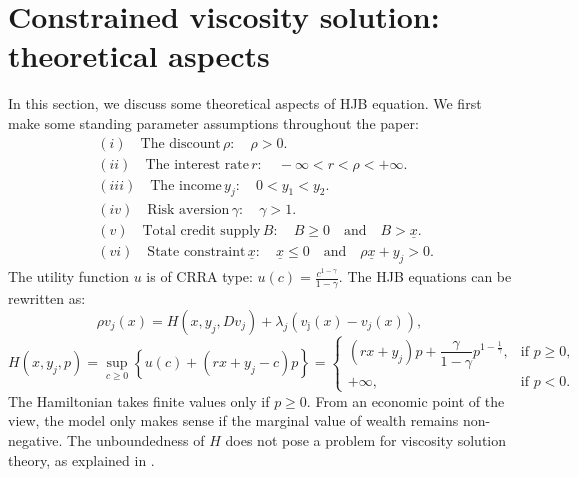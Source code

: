 \documentclass[11pt]{article}
\numberwithin{equation}{section}
\theoremstyle{Claim}
\newcommand{\ux}{{\underline x}}
\newcommand{\beq}{\begin{equation}}
\newcommand{\eeq}{\end{equation}}
\theoremstyle{plain}
\begin{document}
\section{Constrained viscosity solution: theoretical aspects}
In this section, we discuss some theoretical aspects of HJB equation. We first make some standing parameter assumptions throughout the paper:
\beq\label{standing assump}
\begin{aligned}
&(i)\quad\text{The discount}\,\rho: \quad \rho>0.\\
&(ii)\quad\text{The interest rate}\,r:\quad -\infty<r<\rho<+\infty.\\
&(iii)\quad\text{The income}\,y_j:\quad 0<y_1<y_2.\\
&(iv)\quad\text{Risk aversion}\,\gamma:\quad \gamma>1.\\
&(v)\quad\text{Total credit supply}\,B:\quad B\geq 0\quad \text{and}\quad B>\ux.\\
&(vi)\quad\text{State constraint}\,\ux:\quad \ux\leq 0\quad \text{and}\quad \rho \ux + y_j > 0.
\end{aligned}
\eeq
The utility function $u$ is of CRRA type:
$
u(c) = \frac{c^{1-\gamma}}{1-\gamma}.
$
The HJB equations can be rewritten as:
\begin{equation}\label{eq:HJB}
\rho v_j(x) = H(x, y_j, Dv_j) + \lambda_j (v_{\bar{\jmath}}(x) - v_j(x)),
\end{equation}
\begin{equation}\label{def H}
	H(x, y_j, p) = \sup_{c \ge 0} \left\{ u(c) + (r x + y_j - c)p \right\} =
\begin{cases}
	(rx + y_j)p + \dfrac{\gamma}{1 - \gamma} p^{1 - \frac{1}{\gamma}}, & \text{if } p \ge 0, \\
	+\infty, & \text{if } p < 0.
\end{cases}
\end{equation}
The Hamiltonian takes finite values only if $p\geq 0$. From an economic point of the view, the model only makes sense if the marginal value of wealth remains non-negative. The unboundedness of $H$ does not pose a problem for viscosity solution theory, as explained in \cite[p. 87]{barles1994solutions}.
\end{document}
